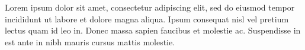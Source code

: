 

\begin{cvparagraph}

Lorem ipsum dolor sit amet, consectetur adipiscing elit, sed do eiusmod tempor incididunt ut labore et dolore magna aliqua. Ipsum consequat nisl vel pretium lectus quam id leo in. Donec massa sapien faucibus et molestie ac. Suspendisse in est ante in nibh mauris cursus mattis molestie.


\end{cvparagraph}
